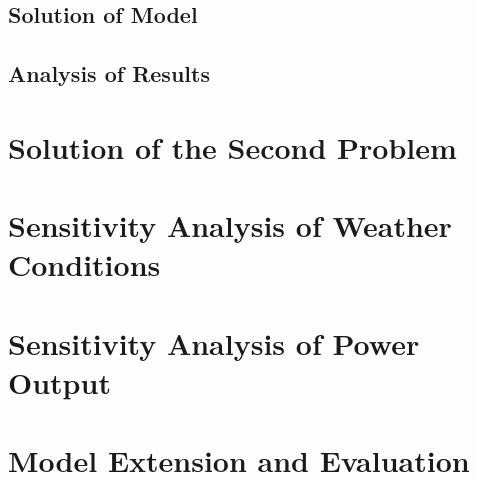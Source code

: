 \documentclass{mcmthesis}
\begin{document}
\subsection{Solution of Model}

\subsection{Analysis of Results}

\section{Solution of the Second Problem}


\section{Sensitivity Analysis of Weather Conditions}

\section{Sensitivity Analysis of Power Output}

\section{Model Extension and Evaluation}



\newpage

\end{document}
